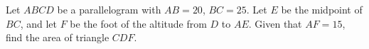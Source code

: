 Let $ABCD$ be a parallelogram with $AB=20$, $BC=25$. Let $E$ be the midpoint of $BC$, and let $F$ be the foot of the altitude from $D$ to $AE$. Given that $AF=15$, find the area of triangle $CDF$.
